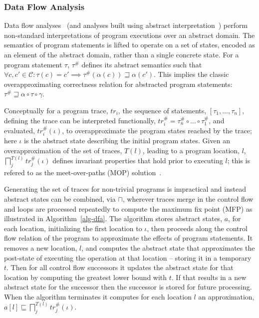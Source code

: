 \subsubsection{Data Flow Analysis}
Data flow analyses~\cite{kildall1973unified} 
(and analyses built using abstract interpretation~\cite{cousot1977abstract}) perform
non-standard interpretations of program executions over an abstract domain.  
The semantics of program statements is lifted to operate
on a set of states, encoded as an element of the abstract domain,
rather than a single concrete state.  
For a program statement $\tau$,
$\tau^\#$ defines its abstract semantics such that
$\forall c, c' \in \mathcal{C} : \tau(c) = c' \implies \tau^\#(\alpha(c)) \sqsupseteq \alpha(c')$.  This implies the classic overapproximating correctness
relation for abstracted program statements:
$\tau^\# \sqsupseteq \alpha \circ \tau \circ \gamma$.

Conceptually for a program trace, $tr_i$, the sequence of 
statements, $[\tau_1,\ldots,\tau_n]$, defining the trace can
be interpreted functionally, $tr_i^\# = \tau_{n}^\# \circ \ldots \circ \tau_1^\#$,
and evaluated, $tr_i^\#(\iota)$,
to overapproximate the program states reached by the trace; 
here $\iota$ is the abstract state describing the initial program states.
Given an overapproximation of the set of traces, $T(l)$, leading to a 
program location, $l$, 
$\displaystyle\bigsqcap_j^{T(l)} tr_j^\#(\iota)$ 
defines invariant properties that hold prior to executing $l$; this
is refered to as the meet-over-paths (MOP) solution~\cite{kildall1973unified}.

Generating the set of traces for non-trivial programs is impractical 
and instead abstract states can be combined, via $\sqcap$, wherever
traces merge in the control flow and loops are processed
repeatedly to compute the maximum fix point (MFP)
as illustrated in Algorithm~\ref{alg-dfa}.
The algorithm stores abstract states, $a$, for each location, initializing
the first location to $\iota$, then proceeds along the control
flow relation of the program to approximate the effects of program
statements.  It removes a new location, $l$, and computes the abstract
state that approximates the post-state of executing the operation
at that location -- storing it in a temporary $t$.  Then for
all control flow successors it updates the abstract state for
that location by computing the greatest lower bound with $t$.
If that results in a new abstract state for the successor then
the successor is stored for future processing.  When the algorithm
terminates it computes for each location $l$ an approximation,
$a[l] \sqsubseteq \displaystyle\bigsqcap_j^{T(l)} tr_j^\#(\iota)$.

